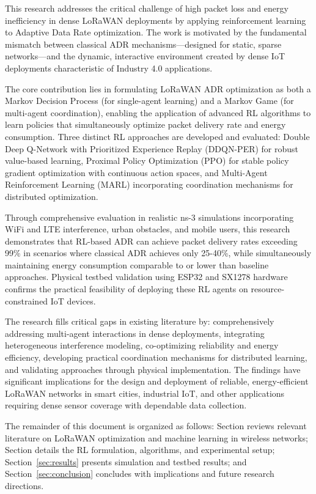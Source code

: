 \documentclass[12pt,a4paper]{article}
\begin{document}
This research addresses the critical challenge of high packet loss and energy inefficiency in dense LoRaWAN deployments by applying reinforcement learning to Adaptive Data Rate optimization. The work is motivated by the fundamental mismatch between classical ADR mechanisms—designed for static, sparse networks—and the dynamic, interactive environment created by dense IoT deployments characteristic of Industry 4.0 applications.

The core contribution lies in formulating LoRaWAN ADR optimization as both a Markov Decision Process (for single-agent learning) and a Markov Game (for multi-agent coordination), enabling the application of advanced RL algorithms to learn policies that simultaneously optimize packet delivery rate and energy consumption. Three distinct RL approaches are developed and evaluated: Double Deep Q-Network with Prioritized Experience Replay (DDQN-PER) for robust value-based learning, Proximal Policy Optimization (PPO) for stable policy gradient optimization with continuous action spaces, and Multi-Agent Reinforcement Learning (MARL) incorporating coordination mechanisms for distributed optimization.

Through comprehensive evaluation in realistic ns-3 simulations incorporating WiFi and LTE interference, urban obstacles, and mobile users, this research demonstrates that RL-based ADR can achieve packet delivery rates exceeding 99\% in scenarios where classical ADR achieves only 25-40\%, while simultaneously maintaining energy consumption comparable to or lower than baseline approaches. Physical testbed validation using ESP32 and SX1278 hardware confirms the practical feasibility of deploying these RL agents on resource-constrained IoT devices.

The research fills critical gaps in existing literature by: comprehensively addressing multi-agent interactions in dense deployments, integrating heterogeneous interference modeling, co-optimizing reliability and energy efficiency, developing practical coordination mechanisms for distributed learning, and validating approaches through physical implementation. The findings have significant implications for the design and deployment of reliable, energy-efficient LoRaWAN networks in smart cities, industrial IoT, and other applications requiring dense sensor coverage with dependable data collection.

The remainder of this document is organized as follows: Section %
reviews relevant literature on LoRaWAN optimization and machine learning in wireless networks; Section
details the RL formulation, algorithms, and experimental setup; Section~\ref{sec:results} presents simulation and testbed results; and Section~\ref{sec:conclusion} concludes with implications and future research directions.
\end{document}
